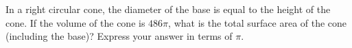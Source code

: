 In a right circular cone, the diameter of the base is equal to the height of the cone. If the volume of the cone is $486\pi$, what is the total surface area of the cone (including the base)? Express your answer in terms of $\pi$.

